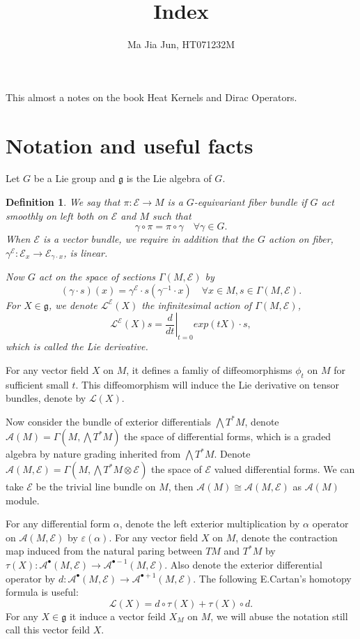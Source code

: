 \documentclass[11pt]{amsart}
\title{Index}
\author{Ma Jia Jun, HT071232M}
\newtheorem{Def}[Thm]{Definition}
\def\cA{{\mathcal{A}}}
\def\cL{{\mathcal{L}}}
\def\cE{{\mathcal{E}}}
\def\fgg{{\mathfrak{g}}}
\begin{document}
\maketitle

This almost a notes on the book Heat Kernels and Dirac Operators\cite{berline2004heat}.

\section{Notation and useful facts}
Let $G$ be a Lie group and $\fgg$ is the Lie algebra of $G$.
\begin{Def}
We say that $\pi:\cE\to M$ is a  $G$-equivariant fiber bundle if $G$ act smoothly on left both on $\cE$ and $M$ such that 
\[
\gamma \circ \pi = \pi \circ \gamma \quad \forall \gamma\in G.
\]
When $\cE$ is a vector bundle, we require in addition that the $G$
action on fiber, $\gamma^\cE:\cE_x \to \cE_{\gamma\cdot x}$,  is linear.

Now $G$ act on the space of sections $\Gamma(M,\cE)$ by 
\[
(\gamma\cdot s)(x) = \gamma^\cE\cdot s(\gamma^{-1}\cdot x) \quad
\forall x\in M, s\in \Gamma(M,\cE). 
\]
For $X \in \fgg$, we denote $\cL^\cE(X)$ the infinitesimal action of
$\Gamma(M,\cE)$, 
\[
\cL^\cE(X) s =\left.\frac{d}{dt}\right|_{t=0} exp(tX)\cdot s,
\]
which is called the Lie derivative.
\end{Def}
For any vector field $X$ on $M$, it defines a famliy of diffeomorphisms $\phi_t$
on $M$ for sufficient small $t$. This diffeomorphism will induce the
Lie derivative on tensor bundles, denote by $\cL(X)$. 

Now consider the bundle of exterior differentials $\bigwedge
T^*M$, denote $\cA(M)=\Gamma(M,\bigwedge T^*M)$  the space of
differential forms, which is a graded algebra by nature grading
inherited from $\bigwedge T^*M$.
Denote $\cA(M,\cE)=\Gamma(M,\bigwedge T^*M\otimes \cE)$  the space
of $\cE$ valued differential forms. We can take $\cE$ be the trivial
line bundle on $M$, then $\cA(M) \cong \cA(M,\cE)$ as $\cA(M)$ module.  

For any differential form $\alpha$, denote the
left exterior multiplication  by $\alpha$ operator on $\cA(M, \cE)$ by
$\varepsilon(\alpha)$.
For any vector field $X$ on $M$, denote the contraction map induced
from the natural paring between $TM$ and $T^*M$ by 
$\tau(X):\cA^\bullet(M,\cE)\to
\cA^{\bullet-1}(M,\cE)$. Also denote the exterior differential
operator by $d:\cA^\bullet(M,\cE) \to \cA^{\bullet+1}(M,\cE)$. The
  following E.Cartan's homotopy formula is useful:
\[
\cL(X) = d\circ \tau(X) + \tau(X)\circ d.
\]
For any $X\in \fgg$ it induce a vector feild $X_M$ on $M$, we will
abuse the notation still call this vector feild $X$.
\end{document}
